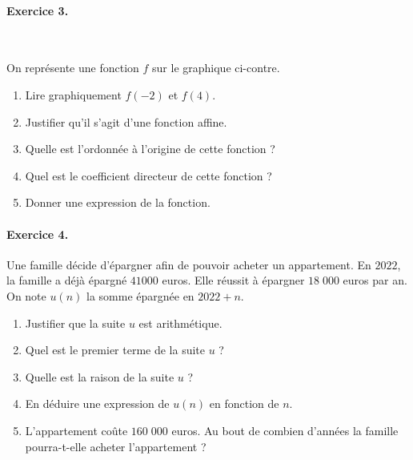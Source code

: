 \documentclass[11pt]{article}
\begin{document}
\paragraph{Exercice 3.}~\\
\begin{minipage}{.5\textwidth}
  On représente une fonction $f$ sur le graphique ci-contre.
  \begin{enumerate}
    \item Lire graphiquement $f(-2)$ et $f(4)$.
    \item Justifier qu'il s'agit d'une fonction affine.
    \item Quelle est l'ordonnée à l'origine de cette fonction ?
    \item Quel est le coefficient directeur de cette fonction ?
    \item Donner une expression de la fonction.
  \end{enumerate}
\end{minipage}
\begin{minipage}{.5\textwidth}
  \begin{center}
  \end{center}
\end{minipage}

\paragraph{Exercice 4.} Une famille décide d'épargner afin de pouvoir acheter un
appartement. En $2022$, la famille a déjà épargné $41 000$ euros. Elle réussit à
épargner $18\;000$ euros par an. On note $u(n)$ la somme épargnée en $2022+n$.
\begin{enumerate}
  \item Justifier que la suite $u$ est arithmétique.
  \item Quel est le premier terme de la suite $u$ ?
  \item Quelle est la raison de la suite $u$ ?
  \item En déduire une expression de $u(n)$ en fonction de $n$.
  \item L'appartement coûte $160\;000$ euros. Au bout de combien d'années la
    famille pourra-t-elle acheter l'appartement ?
\end{enumerate}
\end{document}
